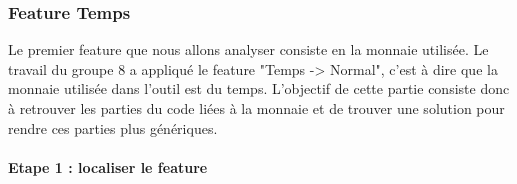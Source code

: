 \subsubsection{Feature Temps}

Le premier feature que nous allons analyser consiste en la monnaie utilisée.  Le travail du groupe 8 a appliqué le feature "Temps -> Normal",  c'est à dire que la monnaie utilisée dans l'outil est du temps.  L'objectif de cette partie consiste donc à retrouver les parties du code liées à la monnaie et de trouver une solution pour rendre ces parties plus génériques.

\paragraph{Etape 1 : localiser le feature}

